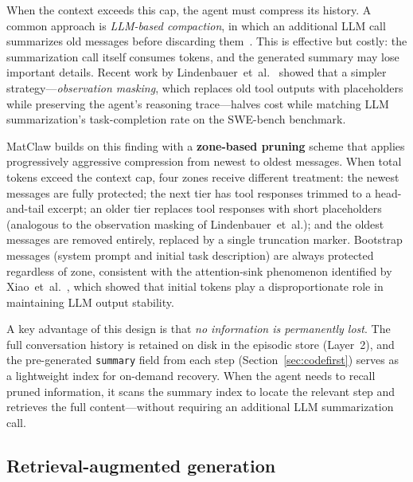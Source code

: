 \documentclass{article}
\begin{document}
When the context exceeds this cap, the agent must compress its history.
A common approach is \emph{LLM-based compaction}, in which an additional LLM call summarizes old messages before discarding them~\citep{Kang2025acon}.
This is effective but costly: the summarization call itself consumes tokens, and the generated summary may lose important details.
Recent work by Lindenbauer~et~al.~\citep{Lindenbauer2025} showed that a simpler strategy---\emph{observation masking}, which replaces old tool outputs with placeholders while preserving the agent's reasoning trace---halves cost while matching LLM summarization's task-completion rate on the SWE-bench benchmark.

MatClaw builds on this finding with a \textbf{zone-based pruning} scheme that applies progressively aggressive compression from newest to oldest messages.
When total tokens exceed the context cap, four zones receive different treatment:
the newest messages are fully protected;
the next tier has tool responses trimmed to a head-and-tail excerpt;
an older tier replaces tool responses with short placeholders (analogous to the observation masking of Lindenbauer~et~al.);
and the oldest messages are removed entirely, replaced by a single truncation marker.
Bootstrap messages (system prompt and initial task description) are always protected regardless of zone, consistent with the attention-sink phenomenon identified by Xiao~et~al.~\citep{Xiao2024streamingllm}, which showed that initial tokens play a disproportionate role in maintaining LLM output stability.

A key advantage of this design is that \emph{no information is permanently lost}.
The full conversation history is retained on disk in the episodic store (Layer~2), and the pre-generated \texttt{summary} field from each step (Section~\ref{sec:codefirst}) serves as a lightweight index for on-demand recovery.
When the agent needs to recall pruned information, it scans the summary index to locate the relevant step and retrieves the full content---without requiring an additional LLM summarization call.

\subsection{Retrieval-augmented generation}
\end{document}
